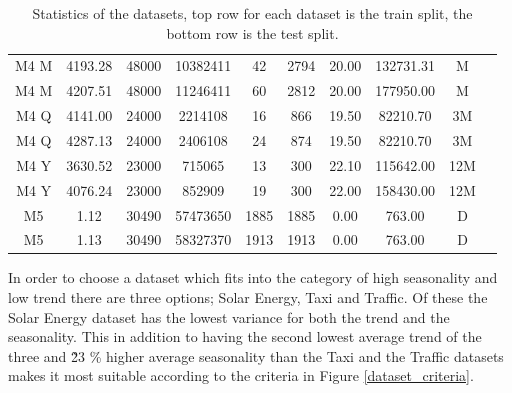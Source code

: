 \begin{table}[htb]
\begin{tabular}{c | c c c c c c c c c}
        \hline
        M4 M              & 4193.28        & 48000            & 10382411        & 42                 & 2794              & 20.00         & 132731.31     & M               \\
        M4 M              & 4207.51        & 48000            & 11246411        & 60                 & 2812              & 20.00         & 177950.00     & M               \\
        \hline
        M4 Q              & 4141.00        & 24000            & 2214108         & 16                 & 866               & 19.50         & 82210.70      & 3M              \\
        M4 Q              & 4287.13        & 24000            & 2406108         & 24                 & 874               & 19.50         & 82210.70      & 3M              \\
        \hline
        M4 Y              & 3630.52        & 23000            & 715065          & 13                 & 300               & 22.10         & 115642.00     & 12M             \\
        M4 Y              & 4076.24        & 23000            & 852909          & 19                 & 300               & 22.00         & 158430.00     & 12M             \\
        \hline
        M5                & 1.12           & 30490            & 57473650        & 1885               & 1885              & 0.00          & 763.00        & D               \\
        M5                & 1.13           & 30490            & 58327370        & 1913               & 1913              & 0.00          & 763.00        & D               \\
        \hline
    \end{tabular}
    \caption{Statistics of the datasets, top row for each dataset is the train split, the bottom row is the test split.}
    \label{tab:dataset_statistics}
\end{table}
\clearpage

In order to choose a dataset which fits into the category of high seasonality and low trend there are three options; Solar Energy, Taxi and Traffic. Of these the Solar Energy dataset has the lowest variance for both the trend and the seasonality. This in addition to having the second lowest average trend of the three and \~23 \% higher average seasonality than the Taxi and the Traffic datasets makes it most suitable according to the criteria in Figure \ref{dataset_criteria}.


